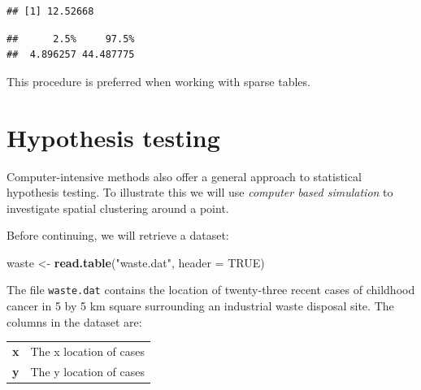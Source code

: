 \documentclass[12pt,a4paper]{book}
\newenvironment{Shaded}{\begin{snugshade}}{\end{snugshade}}
\newcommand{\KeywordTok}[1]{\textcolor[rgb]{0.13,0.29,0.53}{\textbf{#1}}}
\newcommand{\DataTypeTok}[1]{\textcolor[rgb]{0.13,0.29,0.53}{#1}}
\newcommand{\StringTok}[1]{\textcolor[rgb]{0.31,0.60,0.02}{#1}}
\newcommand{\OtherTok}[1]{\textcolor[rgb]{0.56,0.35,0.01}{#1}}
\newcommand{\NormalTok}[1]{#1}
\theoremstyle{definition}
\theoremstyle{definition}
\theoremstyle{definition}
\theoremstyle{remark}
\begin{document}
\begin{verbatim}
## [1] 12.52668
\end{verbatim}

\begin{verbatim}
##      2.5%     97.5% 
##  4.896257 44.487775
\end{verbatim}

This procedure is preferred when working with sparse tables.

\hypertarget{hypothesis-testing}{%
\section{Hypothesis testing}\label{hypothesis-testing}}

Computer-intensive methods also offer a general approach to statistical
hypothesis testing. To illustrate this we will use \emph{computer based
simulation} to investigate spatial clustering around a point.

Before continuing, we will retrieve a dataset:

\begin{Shaded}
\begin{Highlighting}[]
\NormalTok{waste <-}\StringTok{ }\KeywordTok{read.table}\NormalTok{(}\StringTok{"waste.dat"}\NormalTok{, }\DataTypeTok{header =} \OtherTok{TRUE}\NormalTok{)}
\end{Highlighting}
\end{Shaded}

The file \texttt{waste.dat} contains the location of twenty-three recent
cases of childhood cancer in 5 by 5 km square surrounding an industrial
waste disposal site. The columns in the dataset are:

\begin{longtable}[]{@{}ll@{}}
\toprule
\begin{minipage}[t]{0.14\columnwidth}\raggedright
\textbf{x}\strut
\end{minipage} & \begin{minipage}[t]{0.41\columnwidth}\raggedright
The x location of cases\strut
\end{minipage}\tabularnewline
\begin{minipage}[t]{0.14\columnwidth}\raggedright
\textbf{y}\strut
\end{minipage} & \begin{minipage}[t]{0.41\columnwidth}\raggedright
The y location of cases\strut
\end{minipage}\tabularnewline
\bottomrule
\end{longtable}
\end{document}
